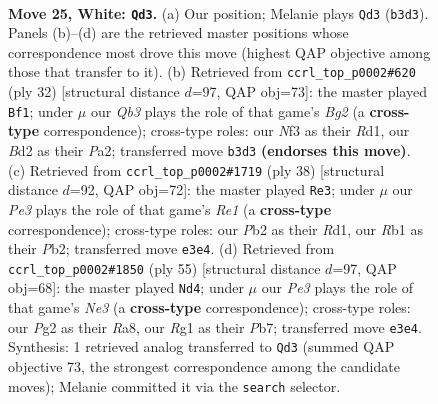 \documentclass[11pt]{article}
\begin{document}
\clearpage

\begin{figure}[p]\centering
\begin{subfigure}{0.46\textwidth}\centering
\resizebox{\linewidth}{!}{%
\newchessgame
\chessboard[
  setfen={rk3b2/pp4pr/q1p1b2p/P2p1p2/3P3P/1Q2PN2/1PKB1PP1/1R4R1 w - - 1 25},
  showmover=false,
  pgfstyle=straightmove, color=movearrow, markmove={b3-d3}
]}
\caption{}
\end{subfigure}\hfill
\begin{subfigure}{0.46\textwidth}\centering
\resizebox{\linewidth}{!}{%
\newchessgame
\chessboard[
  setfen={r4rk1/pb3pp1/1p1qpb1p/3p4/Q2P4/2N1P1P1/PP3PBP/R2R2K1 w - - 1 17},
  showmover=false,
  pgfstyle=straightmove, color=movearrow, markmove={g2-f1}
]}
\caption{}
\end{subfigure}
\\[4pt]
\begin{subfigure}{0.46\textwidth}\centering
\resizebox{\linewidth}{!}{%
\newchessgame
\chessboard[
  setfen={2r1k2r/3bbp2/3p1p1p/p1q1pP2/1p2P3/5BN1/PPPQ2PP/1K1RR3 w k - 2 20},
  showmover=false,
  pgfstyle=straightmove, color=movearrow, markmove={e1-e3}
]}
\caption{}
\end{subfigure}\hfill
\begin{subfigure}{0.46\textwidth}\centering
\resizebox{\linewidth}{!}{%
\newchessgame
\chessboard[
  setfen={r4r2/1p4pk/3pn1qp/p1p1p3/2P1P3/1Q3P2/PP1R2PP/4R1BK b - - 3 28},
  showmover=false,
  pgfstyle=straightmove, color=movearrow, markmove={e6-d4}
]}
\caption{}
\end{subfigure}
\caption{\textbf{Move 25, White: \texttt{Qd3}.} (a) Our position; Melanie plays \texttt{Qd3} (\texttt{b3d3}). Panels (b)--(d) are the retrieved master positions whose correspondence most drove this move (highest QAP objective among those that transfer to it). (b) Retrieved from \texttt{ccrl\_top\_p0002\#620} (ply 32) [structural distance $d$=97, QAP obj=73]: the master played \texttt{Bf1}; under $\mu$ our \emph{Qb3} plays the role of that game's \emph{Bg2} (a \textbf{cross-type} correspondence); cross-type roles: our \emph{N}f3 as their \emph{R}d1, our \emph{B}d2 as their \emph{P}a2; transferred move \texttt{b3d3} \textbf{(endorses this move)}. (c) Retrieved from \texttt{ccrl\_top\_p0002\#1719} (ply 38) [structural distance $d$=92, QAP obj=72]: the master played \texttt{Re3}; under $\mu$ our \emph{Pe3} plays the role of that game's \emph{Re1} (a \textbf{cross-type} correspondence); cross-type roles: our \emph{P}b2 as their \emph{R}d1, our \emph{R}b1 as their \emph{P}b2; transferred move \texttt{e3e4}. (d) Retrieved from \texttt{ccrl\_top\_p0002\#1850} (ply 55) [structural distance $d$=97, QAP obj=68]: the master played \texttt{Nd4}; under $\mu$ our \emph{Pe3} plays the role of that game's \emph{Ne3} (a \textbf{cross-type} correspondence); cross-type roles: our \emph{P}g2 as their \emph{R}a8, our \emph{R}g1 as their \emph{P}b7; transferred move \texttt{e3e4}. Synthesis: 1 retrieved analog transferred to \texttt{Qd3} (summed QAP objective 73, the strongest correspondence among the candidate moves); Melanie committed it via the \texttt{search} selector.}
\label{fig:thought-m48}
\end{figure}
\end{document}
